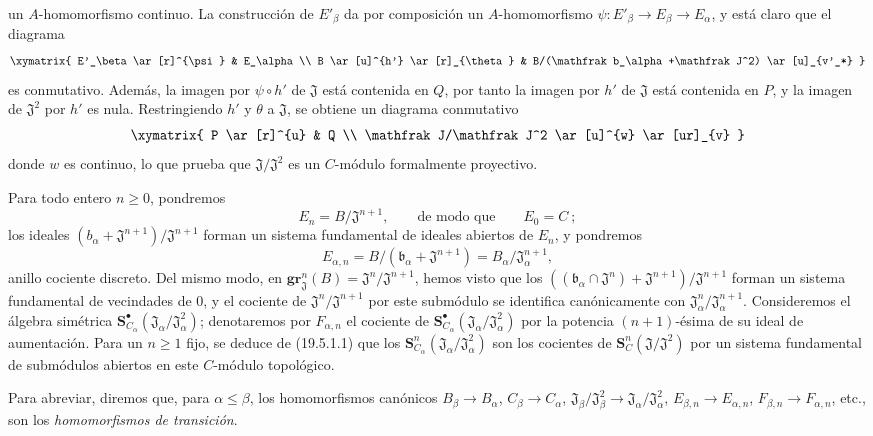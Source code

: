 \begin{env}[19.5.6.1]
un $A$-homomorfismo continuo. La construcción de $E'_\beta$ da por
composición un $A$-homomorfismo $\psi:E'_\beta\to E_\beta\to E_\alpha$, y
está claro que el diagrama
\[
  \xymatrix{
    E'_\beta \ar[r]^{\psi} & E_\alpha \\
    B \ar[u]^{h'} \ar[r]_{\theta} &
    B/(\mathfrak b_\alpha+\mathfrak J^2) \ar[u]_{v'_*}
  }
\]
es conmutativo. Además, la imagen por $\psi\circ h'$ de $\mathfrak J$ está
contenida en $Q$, por tanto la imagen por $h'$ de $\mathfrak J$ está contenida en
$P$, y la imagen de $\mathfrak J^2$ por $h'$ es nula. Restringiendo $h'$ y
$\theta$ a $\mathfrak J$, se obtiene un diagrama conmutativo
\[
  \xymatrix{
    P \ar[r]^{u} & Q \\
    \mathfrak J/\mathfrak J^2 \ar[u]^{w} \ar[ur]_{v}
  }
\]
donde $w$ es continuo, lo que prueba que
$\mathfrak J/\mathfrak J^2$ es un $C$-módulo formalmente proyectivo.
\end{env}



\begin{env}[19.5.6.2]
\label{0.19.5.6.2-fr}
Para todo entero $n\geq0$, pondremos
\[
  E_n=B/\mathfrak J^{n+1},
  \qquad\text{de modo que}\qquad E_0=C~;
\]
los ideales $(b_\alpha+\mathfrak J^{n+1})/\mathfrak J^{n+1}$ forman
un sistema fundamental de ideales abiertos de $E_n$, y pondremos
\[
  E_{\alpha,n}=B/(\mathfrak b_\alpha+\mathfrak J^{n+1})
  =B_\alpha/\mathfrak J_\alpha^{n+1},
\]
anillo cociente discreto. Del mismo modo, en
$\mathbf{gr}_{\mathfrak J}^n(B)=\mathfrak J^n/\mathfrak J^{n+1}$, hemos visto que los
$((\mathfrak b_\alpha\cap\mathfrak J^n)+\mathfrak J^{n+1})/
\mathfrak J^{n+1}$ forman un sistema fundamental de vecindades de $0$, y el
cociente de $\mathfrak J^n/\mathfrak J^{n+1}$ por este submódulo se identifica
canónicamente con $\mathfrak J_\alpha^n/\mathfrak J_\alpha^{n+1}$. Consideremos
el álgebra simétrica
$\mathbf S_{C_\alpha}^\bullet(\mathfrak J_\alpha/\mathfrak J_\alpha^2)$; denotaremos
por $F_{\alpha,n}$ el cociente de
$\mathbf S_{C_\alpha}^\bullet(\mathfrak J_\alpha/\mathfrak J_\alpha^2)$ por la
potencia $(n+1)$-ésima de su ideal de aumentación. Para un $n\geq1$ fijo, se
deduce de (19.5.1.1) que los
$\mathbf S_{C_\alpha}^n(\mathfrak J_\alpha/\mathfrak J_\alpha^2)$ son los
cocientes de $\mathbf S_C^n(\mathfrak J/\mathfrak J^2)$ por un sistema
fundamental de submódulos abiertos en este $C$-módulo topológico.

Para abreviar, diremos que, para $\alpha\leq\beta$, los homomorfismos canónicos
$B_\beta\to B_\alpha$, $C_\beta\to C_\alpha$,
$\mathfrak J_\beta/\mathfrak J_\beta^2\to
\mathfrak J_\alpha/\mathfrak J_\alpha^2$, $E_{\beta,n}\to E_{\alpha,n}$,
$F_{\beta,n}\to F_{\alpha,n}$, etc., son los \emph{homomorfismos de
transición}.
\end{env}

